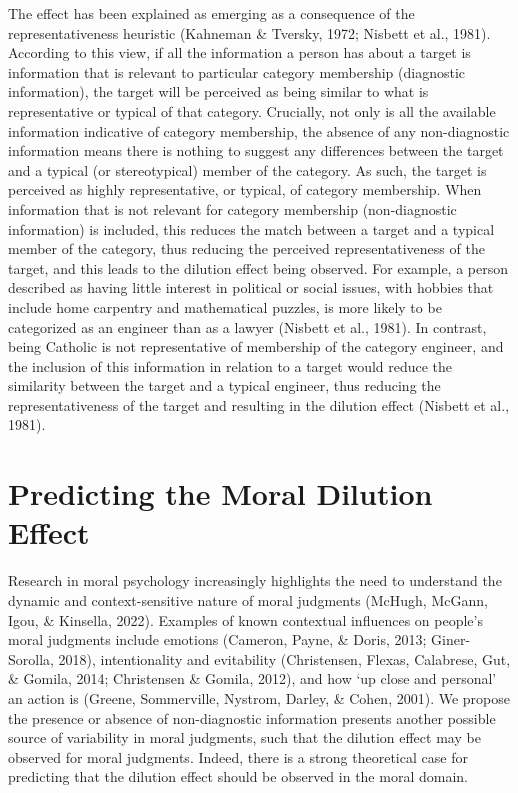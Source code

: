 \documentclass[
  man,floatsintext]{apa6}
\begin{document}
The effect has been explained as emerging as a consequence of the representativeness heuristic (Kahneman \& Tversky, 1972; Nisbett et al., 1981). According to this view, if all the information a person has about a target is information that is relevant to particular category membership (diagnostic information), the target will be perceived as being similar to what is representative or typical of that category. Crucially, not only is all the available information indicative of category membership, the absence of any non-diagnostic information means there is nothing to suggest any differences between the target and a typical (or stereotypical) member of the category. As such, the target is perceived as highly representative, or typical, of category membership. When information that is not relevant for category membership (non-diagnostic information) is included, this reduces the match between a target and a typical member of the category, thus reducing the perceived representativeness of the target, and this leads to the dilution effect being observed. For example, a person described as having little interest in political or social issues, with hobbies that include home carpentry and mathematical puzzles, is more likely to be categorized as an engineer than as a lawyer (Nisbett et al., 1981). In contrast, being Catholic is not representative of membership of the category engineer, and the inclusion of this information in relation to a target would reduce the similarity between the target and a typical engineer, thus reducing the representativeness of the target and resulting in the dilution effect (Nisbett et al., 1981).

\section{Predicting the Moral Dilution Effect}\label{predicting-the-moral-dilution-effect}

Research in moral psychology increasingly highlights the need to understand the dynamic and context-sensitive nature of moral judgments (McHugh, McGann, Igou, \& Kinsella, 2022). Examples of known contextual influences on people's moral judgments include emotions (Cameron, Payne, \& Doris, 2013; Giner-Sorolla, 2018), intentionality and evitability (Christensen, Flexas, Calabrese, Gut, \& Gomila, 2014; Christensen \& Gomila, 2012), and how `up close and personal' an action is (Greene, Sommerville, Nystrom, Darley, \& Cohen, 2001). We propose the presence or absence of non-diagnostic information presents another possible source of variability in moral judgments, such that the dilution effect may be observed for moral judgments. Indeed, there is a strong theoretical case for predicting that the dilution effect should be observed in the moral domain.
\end{document}
